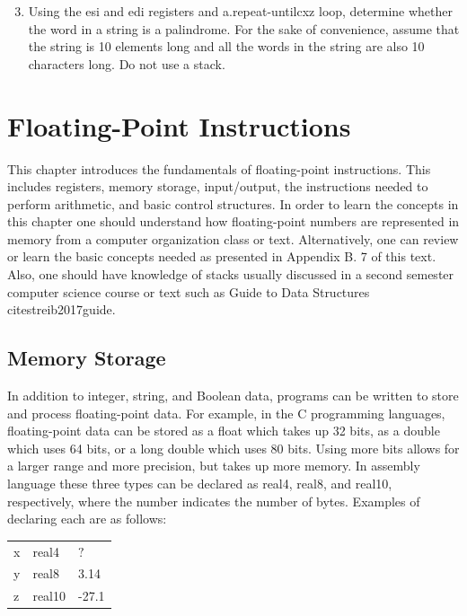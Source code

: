 \documentclass[10pt]{book}
\begin{document}
\begin{enumerate}
  \setcounter{enumi}{2}
  \item Using the esi and edi registers and a.repeat-untilcxz loop, determine whether the word in a string is a palindrome. For the sake of convenience, assume that the string is 10 elements long and all the words in the string are also 10 characters long. Do not use a stack.
\end{enumerate}


\chapter{Floating-Point Instructions}
This chapter introduces the fundamentals of floating-point instructions. This includes registers, memory storage, input/output, the instructions needed to perform arithmetic, and basic control structures. In order to learn the concepts in this chapter one should understand how floating-point numbers are represented in memory from a computer organization class or text. Alternatively, one can review or learn the basic concepts needed as presented in Appendix B. 7 of this text. Also, one should have knowledge of stacks usually discussed in a second semester computer science course or text such as Guide to Data Structures \\cite{streib2017guide}.

\section{Memory Storage}
In addition to integer, string, and Boolean data, programs can be written to store and process floating-point data. For example, in the C programming languages, floating-point data can be stored as a float which takes up 32 bits, as a double which uses 64 bits, or a long double which uses 80 bits. Using more bits allows for a larger range and more precision, but takes up more memory. In assembly language these three types can be declared as real4, real8, and real10, respectively, where the number indicates the number of bytes. Examples of declaring each are as follows:

\begin{center}
\begin{tabular}{lll}
x & real4 & $?$ \\
y & real8 & 3.14 \\
z & real10 & -27.1 \\
\end{tabular}
\end{center}
\end{document}
